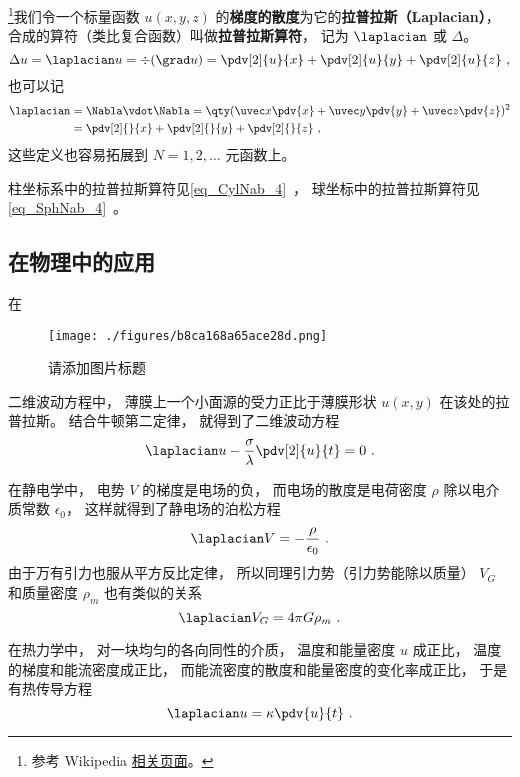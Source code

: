 

\footnote{参考 Wikipedia \href{https://en.wikipedia.org/wiki/Laplace_operator}{相关页面}。}我们令一个标量函数 $u(x, y, z)$ 的\textbf{梯度的散度}为它的\textbf{拉普拉斯（Laplacian）}， 合成的算符（类比复合函数）叫做\textbf{拉普拉斯算符}， 记为 $\laplacian$ 或 $\Delta$。
\begin{equation}
\Delta u = \laplacian u = \div (\grad u) = \pdv[2]{u}{x} + \pdv[2]{u}{y} + \pdv[2]{u}{z}~,
\end{equation}
也可以记
\begin{equation}
\begin{aligned}
\laplacian &= \Nabla \vdot \Nabla = \qty(\uvec x\pdv{x} + \uvec y\pdv{y} + \uvec z\pdv{z})^2\\
&= \pdv[2]{}{x} + \pdv[2]{}{y} + \pdv[2]{}{z}~,
\end{aligned}
\end{equation}
这些定义也容易拓展到 $N = 1, 2, \dots$ 元函数上。

柱坐标系中的拉普拉斯算符见\autoref{eq_CylNab_4}~， 球坐标中的拉普拉斯算符见\autoref{eq_SphNab_4}~。

\subsection{在物理中的应用}
在\begin{figure}[ht]
\centering
\texttt{[image: ./figures/b8ca168a65ace28d.png]}
\caption{请添加图片标题} \label{fig_Laplac_1}
\end{figure}
二维波动方程中， 薄膜上一个小面源的受力正比于薄膜形状 $u(x, y)$ 在该处的拉普拉斯。 结合牛顿第二定律， 就得到了二维波动方程
\begin{equation}
\laplacian u - \frac{\sigma}{\lambda}\pdv[2]{u}{t} = 0~.
\end{equation}

在静电学中， 电势 $V$ 的梯度是电场的负， 而电场的散度是电荷密度 $\rho$ 除以电介质常数 $\epsilon_0$， 这样就得到了静电场的泊松方程
\begin{equation}
\laplacian V = -\frac{\rho}{\epsilon_0}~.
\end{equation}
由于万有引力也服从平方反比定律， 所以同理引力势（引力势能除以质量） $V_G$ 和质量密度 $\rho_m$ 也有类似的关系
\begin{equation}
\laplacian V_G = 4\pi G \rho_m~.
\end{equation}

在热力学中， 对一块均匀的各向同性的介质， 温度和能量密度 $u$ 成正比， 温度的梯度和能流密度成正比， 而能流密度的散度和能量密度的变化率成正比， 于是有热传导方程
\begin{equation}
\laplacian u = \kappa \pdv{u}{t}~.
\end{equation}
